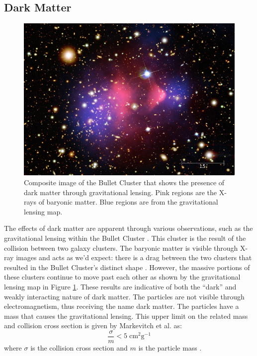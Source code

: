 \documentclass[thesis.tex]{subfiles}
\begin{document}
\subsection{Dark Matter} \label{subsec:DM}
\begin{figure}[t]
	\centering
	\includegraphics[width=0.8\linewidth]{figures/bullet-cluster.jpg}
	\caption{
	Composite image of the Bullet Cluster that shows the presence of dark matter through gravitational lensing.
	Pink regions are the X-rays of baryonic matter.
	Blue regions are from the gravitational lensing map. \cite{Bullet-Image}
	}
	\label{fig:bullet-cluster}
\end{figure}
The effects of dark matter are apparent through various observations, such as the gravitational lensing within the Bullet Cluster \cite{Bullet}.
This cluster is the result of the collision between two galaxy clusters.
The baryonic matter is visible through X-ray images and acts as we'd expect: there is a drag between the two clusters that resulted in the Bullet Cluster's distinct shape \cite{Bullet}.
However, the massive portions of these clusters continue to move past each other as shown by the gravitational lensing map in Figure \ref{fig:bullet-cluster}.
These results are indicative of both the ``dark'' and weakly interacting nature of dark matter.
The particles are not visible through electromagnetism, thus receiving the name dark matter.
The particles have a mass that causes the gravitational lensing.
This upper limit on the related mass and collision cross section is given by Markevitch et al. \cite{DM_Hist} as:
\begin{equation} \label{eq:DM-Mass-Lim}
	\frac{\sigma}{m} < 5 \; \text{cm}^2 \text{g}^{-1}
\end{equation}
where $\sigma$ is the collision cross section and $m$ is the particle mass \cite{Bullet}.
\end{document}
